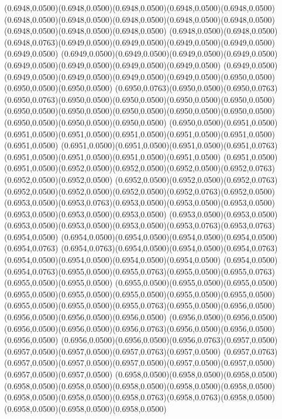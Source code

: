 (0.6948,0.0500)(0.6948,0.0500)(0.6948,0.0500)(0.6948,0.0500)(0.6948,0.0500)
\PST@Solid(0.6948,0.0500)(0.6948,0.0500)(0.6948,0.0500)(0.6948,0.0500)(0.6948,0.0500)(0.6948,0.0500)(0.6948,0.0500)(0.6948,0.0500)
(0.6948,0.0500)(0.6948,0.0500)(0.6948,0.0763)(0.6949,0.0500)(0.6949,0.0500)(0.6949,0.0500)(0.6949,0.0500)(0.6949,0.0500)
(0.6949,0.0500)(0.6949,0.0500)(0.6949,0.0500)(0.6949,0.0500)(0.6949,0.0500)(0.6949,0.0500)(0.6949,0.0500)(0.6949,0.0500)
(0.6949,0.0500)(0.6949,0.0500)(0.6949,0.0500)(0.6949,0.0500)(0.6949,0.0500)(0.6950,0.0500)(0.6950,0.0500)(0.6950,0.0500)
(0.6950,0.0763)(0.6950,0.0500)(0.6950,0.0763)(0.6950,0.0763)(0.6950,0.0500)(0.6950,0.0500)(0.6950,0.0500)(0.6950,0.0500)
(0.6950,0.0500)(0.6950,0.0500)(0.6950,0.0500)(0.6950,0.0500)(0.6950,0.0500)(0.6950,0.0500)(0.6950,0.0500)(0.6950,0.0500)
(0.6950,0.0500)(0.6951,0.0500)(0.6951,0.0500)(0.6951,0.0500)(0.6951,0.0500)(0.6951,0.0500)(0.6951,0.0500)(0.6951,0.0500)
(0.6951,0.0500)(0.6951,0.0500)(0.6951,0.0500)(0.6951,0.0763)(0.6951,0.0500)(0.6951,0.0500)(0.6951,0.0500)(0.6951,0.0500)
(0.6951,0.0500)(0.6951,0.0500)(0.6952,0.0500)(0.6952,0.0500)(0.6952,0.0500)(0.6952,0.0763)(0.6952,0.0500)(0.6952,0.0500)
(0.6952,0.0500)(0.6952,0.0500)(0.6952,0.0763)(0.6952,0.0500)(0.6952,0.0500)(0.6952,0.0500)(0.6952,0.0763)(0.6952,0.0500)
(0.6953,0.0500)(0.6953,0.0763)(0.6953,0.0500)(0.6953,0.0500)(0.6953,0.0500)(0.6953,0.0500)(0.6953,0.0500)(0.6953,0.0500)
(0.6953,0.0500)(0.6953,0.0500)(0.6953,0.0500)(0.6953,0.0500)(0.6953,0.0500)(0.6953,0.0763)(0.6953,0.0763)(0.6954,0.0500)
(0.6954,0.0500)(0.6954,0.0500)(0.6954,0.0500)(0.6954,0.0500)(0.6954,0.0763)
\PST@Solid(0.6954,0.0763)(0.6954,0.0500)(0.6954,0.0500)(0.6954,0.0763)(0.6954,0.0500)(0.6954,0.0500)(0.6954,0.0500)(0.6954,0.0500)
(0.6954,0.0500)(0.6954,0.0763)(0.6955,0.0500)(0.6955,0.0763)(0.6955,0.0500)(0.6955,0.0763)(0.6955,0.0500)(0.6955,0.0500)
(0.6955,0.0500)(0.6955,0.0500)(0.6955,0.0500)(0.6955,0.0500)(0.6955,0.0500)(0.6955,0.0500)(0.6955,0.0500)(0.6955,0.0500)
(0.6955,0.0500)(0.6955,0.0500)(0.6955,0.0763)(0.6955,0.0500)(0.6956,0.0500)(0.6956,0.0500)(0.6956,0.0500)(0.6956,0.0500)
(0.6956,0.0500)(0.6956,0.0500)(0.6956,0.0500)(0.6956,0.0500)(0.6956,0.0763)(0.6956,0.0500)(0.6956,0.0500)(0.6956,0.0500)
(0.6956,0.0500)(0.6956,0.0500)(0.6956,0.0763)(0.6957,0.0500)(0.6957,0.0500)(0.6957,0.0500)(0.6957,0.0763)(0.6957,0.0500)
(0.6957,0.0763)(0.6957,0.0500)(0.6957,0.0500)(0.6957,0.0500)(0.6957,0.0500)(0.6957,0.0500)(0.6957,0.0500)(0.6957,0.0500)
(0.6958,0.0500)(0.6958,0.0500)(0.6958,0.0500)(0.6958,0.0500)(0.6958,0.0500)(0.6958,0.0500)(0.6958,0.0500)(0.6958,0.0500)
(0.6958,0.0500)(0.6958,0.0500)(0.6958,0.0763)(0.6958,0.0763)(0.6958,0.0500)(0.6958,0.0500)(0.6958,0.0500)(0.6958,0.0500)
